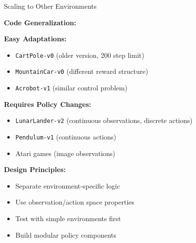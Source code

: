 \documentclass[aspectratio=169,10pt]{beamer}
\begin{document}
\begin{frame}{Scaling to Other Environments}

\textbf{Code Generalization:}

\vfill

\textbf{Easy Adaptations:}
\begin{itemize}
    \item \texttt{CartPole-v0} (older version, 200 step limit)
    \item \texttt{MountainCar-v0} (different reward structure)
    \item \texttt{Acrobot-v1} (similar control problem)
\end{itemize}

\vfill

\textbf{Requires Policy Changes:}
\begin{itemize}
    \item \texttt{LunarLander-v2} (continuous observations, discrete actions)
    \item \texttt{Pendulum-v1} (continuous actions)
    \item Atari games (image observations)
\end{itemize}

\vfill

\textbf{Design Principles:}
\begin{itemize}
    \item Separate environment-specific logic
    \item Use observation/action space properties
    \item Test with simple environments first
    \item Build modular policy components
\end{itemize}

\end{frame}
\end{document}
